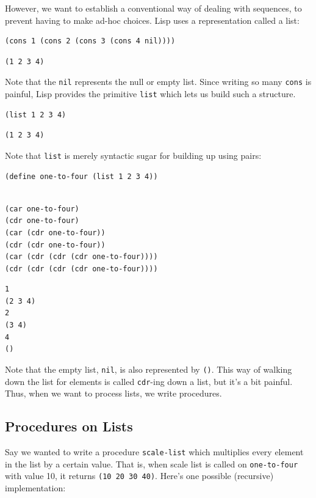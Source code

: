 \documentclass[9pt]{report}
\begin{document}
However, we want to establish a conventional way of dealing with
sequences, to prevent having to make ad-hoc choices. Lisp uses a
representation called a list:

\begin{verbatim}
(cons 1 (cons 2 (cons 3 (cons 4 nil))))
\end{verbatim}

\begin{verbatim}
(1 2 3 4)
\end{verbatim}


Note that the \texttt{nil} represents the null or empty list. Since
writing so many \texttt{cons} is painful, Lisp provides the primitive
\texttt{list} which lets us build such a structure.

\begin{verbatim}
(list 1 2 3 4)
\end{verbatim}

\begin{verbatim}
(1 2 3 4)
\end{verbatim}


Note that \texttt{list} is merely syntactic sugar for building up using
pairs:

\begin{verbatim}
(define one-to-four (list 1 2 3 4))
\end{verbatim}

\begin{verbatim}

(car one-to-four)
(cdr one-to-four)
(car (cdr one-to-four))
(cdr (cdr one-to-four))
(car (cdr (cdr (cdr one-to-four))))
(cdr (cdr (cdr (cdr one-to-four))))
\end{verbatim}

\begin{verbatim}
1
(2 3 4)
2
(3 4)
4
()
\end{verbatim}


Note that the empty list, \texttt{nil}, is also represented by \texttt{()}. This
way of walking down the list for elements is called \texttt{cdr}-ing down
a list, but it's a bit painful. Thus, when we want to process
lists, we write procedures.

\subsection{Procedures on Lists}
\label{sec:org46fe24f}

Say we wanted to write a procedure \texttt{scale-list} which multiplies
every element in the list by a certain value. That is, when scale
list is called on \texttt{one-to-four} with value 10, it returns \texttt{(10 20
    30 40)}. Here's one possible (recursive) implementation:
\end{document}
